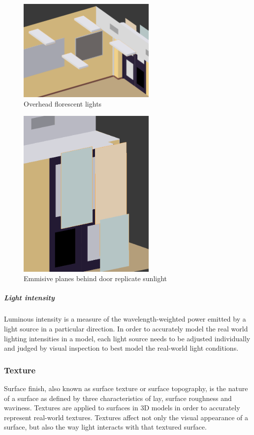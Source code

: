 \documentclass[11pt,a4paper]{report}
\begin{document}
						\begin{figure}[H]
							\centering
							\includegraphics[width=0.6\textwidth]{overhead_lights}
							\caption{Overhead florescent lights}
						\end{figure}
						\begin{figure}[H]
							\centering
							\includegraphics[width=0.6\textwidth]{lights_behind_door}
							\caption{Emmisive planes behind door replicate sunlight}
						\end{figure}
					
					\subparagraph{Light intensity}
						Luminous intensity is a measure of the wavelength-weighted power emitted by a light source in a particular direction. In order to accurately model the real world lighting intensities in a model, each light source needs to be adjusted individually and judged by visual inspection to best model the real-world light conditions.
						
			\subsubsection{Texture}
				Surface finish, also known as surface texture or surface topography, is the nature of a surface as defined by three characteristics of lay, surface roughness and waviness.
				\cite{e._paul_degarmo_materials_2003}
				Textures are applied to surfaces in 3D models in order to accurately represent real-world textures. Textures affect not only the visual appearance of a surface, but also the way light interacts with that textured surface.
			
\end{document}
